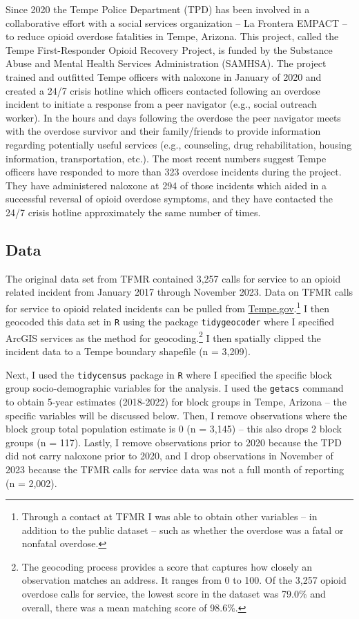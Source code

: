 Since 2020 the Tempe Police Department (TPD) has been involved in a collaborative effort with a social services organization – La Frontera EMPACT – to reduce opioid overdose fatalities in Tempe, Arizona. This project, called the Tempe First-Responder Opioid Recovery Project, is funded by the Substance Abuse and Mental Health Services Administration (SAMHSA). The project trained and outfitted Tempe officers with naloxone in January of 2020 and created a 24/7 crisis hotline which officers contacted following an overdose incident to initiate a response from a peer navigator (e.g., social outreach worker). In the hours and days following the overdose the peer navigator meets with the overdose survivor and their family/friends to provide information regarding potentially useful services (e.g., counseling, drug rehabilitation, housing information, transportation, etc.). The most recent numbers suggest Tempe officers have responded to more than 323 overdose incidents during the project. They have administered naloxone at 294 of those incidents which aided in a successful reversal of opioid overdose symptoms, and they have contacted the 24/7 crisis hotline approximately the same number of times. 

\subsection{Data}
The original data set from TFMR contained 3,257 calls for service to an opioid related incident from January 2017 through November 2023. Data on TFMR calls for service to opioid related incidents can be pulled from \href{https://data.tempe.gov/datasets/2daeeafd2741494c8294ca415e5a793e_0/explore?location=33.398962%2C-111.931850%2C11.94}{Tempe.gov}.\footnote{Through a contact at TFMR I was able to obtain other variables -- in addition to the public dataset -- such as whether the overdose was a fatal or nonfatal overdose.} I then geocoded this data set in \texttt{R} using the package \texttt{tidygeocoder} where I specified ArcGIS services as the method for geocoding.\footnote{The geocoding process provides a score that captures how closely an observation matches an address. It ranges from 0 to 100. Of the 3,257 opioid overdose calls for service, the lowest score in the dataset was 79.0\% and overall, there was a mean matching score of 98.6\%.} I then spatially clipped the incident data to a Tempe boundary shapefile (n = 3,209). 

Next, I used the \texttt{tidycensus} package in \texttt{R} where I specified the specific block group socio-demographic variables for the analysis. I used the \texttt{getacs} command to obtain 5-year estimates (2018-2022) for block groups in Tempe, Arizona -- the specific variables will be discussed below. Then, I remove observations where the block group total population estimate is 0 (n = 3,145) -- this also drops 2 block groups (n = 117). Lastly, I remove observations prior to 2020 because the TPD did not carry naloxone prior to 2020, and I drop observations in November of 2023 because the TFMR calls for service data was not a full month of reporting (n = 2,002). 

